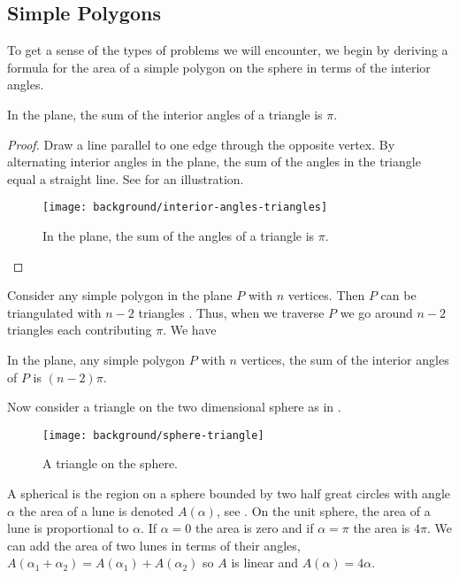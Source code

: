 \subsection{Simple Polygons}
\label{sec:warm-up}

To get a sense of the types of problems we will encounter,
we begin by deriving a formula for the area
of a simple polygon on the sphere in terms of the 
interior angles.
\begin{theorem}\label{thm:triangle}
In the plane, the sum of the interior angles of a triangle is $\pi$.
\end{theorem}
\begin{proof}
Draw a line parallel to one edge through the opposite vertex.
By alternating interior angles in the plane, the sum of the angles
in the triangle equal  a straight line.
See  for an illustration. 

\begin{figure}[htb]
\centering
\texttt{[image: background/interior-angles-triangles]}
\caption{In the plane, the sum of the angles of a triangle is $\pi$.}
\label{fig:angles}
\end{figure}

\end{proof}

Consider any simple polygon in the plane $P$ with $n$ vertices. 
Then $P$ can be triangulated with $n-2$ triangles \cite{orourke_computational_1994}.
Thus, when we traverse $P$ we go around $n-2$ triangles each contributing
$\pi$.
We have
\begin{corollary}\label{cor:angles}
In the plane, any simple polygon $P$ with $n$ vertices,
the sum of the interior angles of $P$ is $(n-2)\pi$.

\end{corollary}

Now consider a triangle on the two dimensional sphere as in .

\begin{figure}[htb]
\centering
\texttt{[image: background/sphere-triangle]}
\caption{A triangle on the sphere.}
\label{fig:sphere-triangle}
\end{figure}
A spherical  is the region on a sphere bounded by two half great circles
with angle $\alpha$ the area of a lune is denoted $A(\alpha)$,
 see .
On the unit sphere, the area of a lune is proportional to $\alpha$. 
If $\alpha=0$ the area is zero and if $\alpha=\pi$ the area is $4\pi$.
We can add the area of two lunes in terms of their angles, 
$A(\alpha_1+\alpha_2)=A(\alpha_1)+A(\alpha_2)$ so $A$ is linear
and  $A(\alpha)=4\alpha.$


